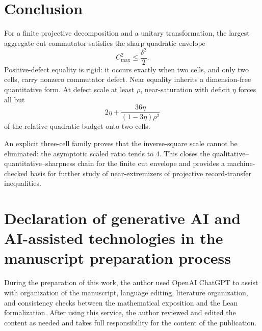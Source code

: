\documentclass[11pt]{article}
\newcommand{\cmax}{C_{\max}}
\newcommand{\dd}{\delta}
\newcommand{\etaq}{\eta}
\begin{document}
\section{Conclusion}

For a finite projective decomposition and a unitary transformation, the
largest aggregate cut commutator satisfies the sharp quadratic envelope
\[
  \cmax^2\le\frac{\dd^2}{2}.
\]
Positive-defect equality is rigid: it occurs exactly when two cells, and only
two cells, carry nonzero commutator defect.  Near equality inherits a
dimension-free quantitative form.  At defect scale at least $\rho$,
near-saturation with deficit $\etaq$ forces all but
\[
  2\etaq+
  \frac{36\etaq}{(1-3\etaq)\rho^2}
\]
of the relative quadratic budget onto two cells.

An explicit three-cell family proves that the inverse-square scale cannot be
eliminated: the asymptotic scaled ratio tends to $4$.  This closes the
qualitative--quantitative--sharpness chain for the finite cut envelope and
provides a machine-checked basis for further study of near-extremizers of
projective record-transfer inequalities.

\section*{Declaration of generative AI and AI-assisted technologies in the manuscript preparation process}

During the preparation of this work, the author used OpenAI ChatGPT to assist
with organization of the manuscript, language editing, literature
organization, and consistency checks between the mathematical exposition and
the Lean formalization. After using this service, the author reviewed and
edited the content as needed and takes full responsibility for the content of
the publication.



\end{document}
